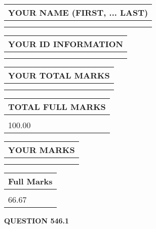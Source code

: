\documentclass{ctexart}
\begin{document}
   
   
   
\newpage 
\setcounter{page}{ 
   546001 } 
   
   
   
   
\noindent\begin{tabular}{|l|}
\hline
YOUR NAME (FIRST, ... LAST)  \\
\hline
 \\ 
 \\ 
\hline
\end{tabular}
\hspace{0.05in} \begin{tabular}{|l|}
\hline
 YOUR   ID   INFORMATION  \\
\hline
 \\ 
 \\ 
\hline
\end{tabular}
   
   
\vspace{0.2in}\noindent\begin{tabular}{|l|}
\hline
YOUR TOTAL MARKS  \\
\hline
 \\ 
 \\ 
\hline
\end{tabular}
\hspace{0.05in} \begin{tabular}{|l|}
\hline
TOTAL FULL MARKS  \\
\hline
 \\ 
100.00 \\
\hline
\end{tabular}
   
   
 \vspace{0.2in}
 
 
 
 
   
   
  
\vspace{0.2in}
  
\noindent\begin{tabular}{|l|}
\hline
 YOUR MARKS  \\
\hline
 \\ 
 \\ 
\hline
\end{tabular}
\hspace{0.05in} \begin{tabular}{|l|}
\hline
 Full Marks  \\
\hline
 \\ 
66.67 \\
\hline
\end{tabular}
{\textbf{\Large{QUESTION
546.1 
}}}
  
\end{document}
